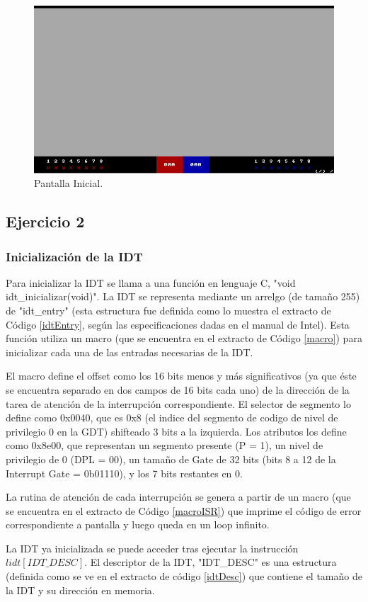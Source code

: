 \documentclass[a4paper]{article}
\begin{document}
\begin{figure}[ht!]
\centering
\includegraphics[width=120mm]{imagenes/pantalla.png}
\caption{Pantalla Inicial.}
\end{figure}

\subsection{Ejercicio 2}

\subsubsection*{Inicialización de la IDT}

\par Para inicializar la IDT se llama a una funci\'on en lenguaje C, "void idt\_inicializar(void)". La IDT se representa mediante un arrelgo (de tama\~no 255) de "idt\_entry"
(esta estructura fue definida como lo muestra el extracto de C\'odigo \ref{idtEntry}, seg\'un las especificaciones dadas en el manual de Intel). Esta funci\'on utiliza un macro
(que se encuentra en el extracto de C\'odigo \ref{macro}) para inicializar cada una de las entradas necesarias de la IDT. 
\par El macro define el offset como los 16 bits menos y m\'as significativos (ya que \'este se encuentra separado en dos campos de 16 bits cada uno) de la direcci\'on de la tarea de atenci\'on
de la interrupci\'on correspondiente. El selector de segmento lo define como 0x0040, que es 0x8 (el indice del segmento de codigo de nivel de privilegio 0 en la GDT) shifteado 3 bits a la izquierda.
Los atributos los define como 0x8e00, que representan un segmento presente (P = 1), un nivel de privilegio de 0 (DPL = 00), un tama\~no de Gate de 32 bits (bits 8 a 12 de la Interrupt Gate = 0b01110),
y los 7 bits restantes en 0. 
\par La rutina de atenci\'on de cada interrupci\'on se genera a partir de un macro (que se encuentra en el extracto de C\'odigo \ref{macroISR}) que imprime el c\'odigo de error correspondiente
a pantalla y luego queda en un loop infinito.
\par La IDT ya inicializada se puede acceder tras ejecutar la instrucci\'on $lidt [IDT\_DESC]$. El descriptor de la IDT, "IDT\_DESC" es una estructura (definida como se ve en el extracto de
c\'odigo \ref{idtDesc}) que contiene el tama\~no de la IDT y su direcci\'on en memoria.
\end{document}
